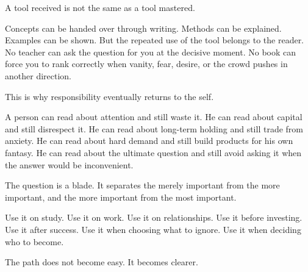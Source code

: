 A tool received is not the same as a tool mastered.

Concepts can be handed over through writing. Methods can be explained. Examples can be shown. But the repeated use of the tool belongs to the reader. No teacher can ask the question for you at the decisive moment. No book can force you to rank correctly when vanity, fear, desire, or the crowd pushes in another direction.

This is why responsibility eventually returns to the self.

A person can read about attention and still waste it. He can read about capital and still disrespect it. He can read about long-term holding and still trade from anxiety. He can read about hard demand and still build products for his own fantasy. He can read about the ultimate question and still avoid asking it when the answer would be inconvenient.

The question is a blade. It separates the merely important from the more important, and the more important from the most important.

Use it on study. Use it on work. Use it on relationships. Use it before investing. Use it after success. Use it when choosing what to ignore. Use it when deciding who to become.

The path does not become easy. It becomes clearer.
